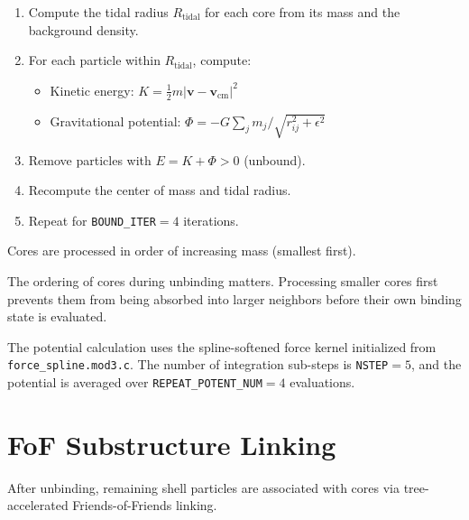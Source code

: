 \documentclass[11pt,fleqn]{book}
\newcommand{\code}[1]{\texttt{#1}}
\newcommand{\file}[1]{\texttt{#1}}
\begin{document}
\begin{algorithm}
\begin{enumerate}[leftmargin=2em]
  \item Compute the tidal radius $R_\text{tidal}$ for each core from its mass and the background density.
  \item For each particle within $R_\text{tidal}$, compute:
    \begin{itemize}[leftmargin=2em]
      \item Kinetic energy: $K = \frac{1}{2} m |\mathbf{v} - \mathbf{v}_\text{cm}|^2$
      \item Gravitational potential: $\Phi = -G \sum_j m_j / \sqrt{r_{ij}^2 + \epsilon^2}$
    \end{itemize}
  \item Remove particles with $E = K + \Phi > 0$ (unbound).
  \item Recompute the center of mass and tidal radius.
  \item Repeat for \code{BOUND\_ITER}${}=4$ iterations.
\end{enumerate}
Cores are processed in order of increasing mass (smallest first).
\end{algorithm}

\begin{important}
The ordering of cores during unbinding matters.  Processing smaller cores first prevents them from being absorbed into larger neighbors before their own binding state is evaluated.
\end{important}

The potential calculation uses the spline-softened force kernel initialized from \file{force\_spline.mod3.c}.  The number of integration sub-steps is \code{NSTEP}${}=5$, and the potential is averaged over \code{REPEAT\_POTENT\_NUM}${}=4$ evaluations.

\section{FoF Substructure Linking}

After unbinding, remaining shell particles are associated with cores via tree-accelerated Friends-of-Friends linking.
\end{document}
